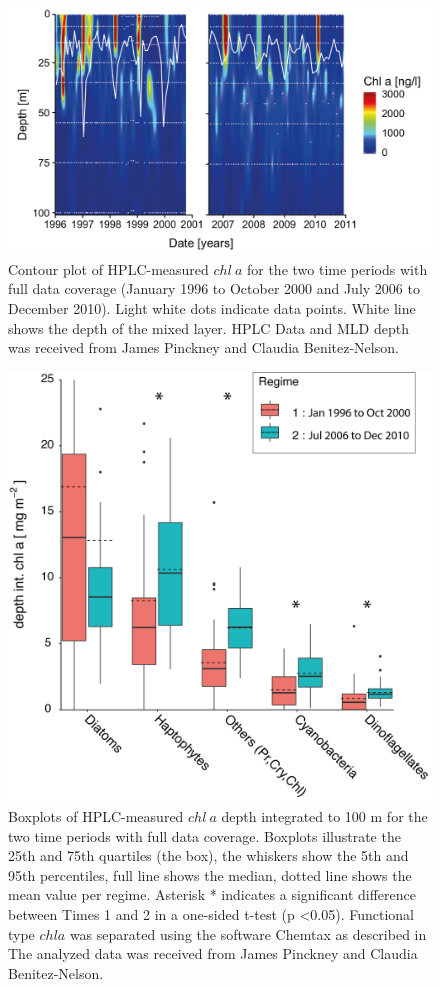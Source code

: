 \begin{figure}
\centering
\includegraphics[trim = 0mm 0mm 0mm 0mm, clip, width=.9\linewidth]{./Chp2-Pre/Pinckneyetal2015_TotChlAcontoursMLD.png}
\caption[Scheme]{\small {Contour plot of HPLC-measured $chl~a$ for the two time periods with full data coverage (January 1996 to October 2000 and July 2006 to December 2010). Light white dots indicate data points. White line shows the depth of the mixed layer. HPLC Data and MLD depth was received from James Pinckney and Claudia Benitez-Nelson.}}
\label{TChlAPinckney}
\end{figure}


\begin{figure}
\centering
\includegraphics[trim = 0mm 0mm 0mm 0mm, clip, width=.7\linewidth]{./Chp2-Pre/PFT_groupsAsset511.png}
\caption[Scheme]{\small {Boxplots of HPLC-measured $chl~a$ depth integrated to 100 m for the two time periods with full data coverage. Boxplots illustrate the 25th and 75th quartiles (the box), the whiskers show the 5th and 95th percentiles, full line shows the median, dotted line shows the mean value per regime. Asterisk * indicates a significant difference between Times 1 and 2 in a one-sided t-test (p \textless	 0.05). Functional type $chl a$ was separated using the software Chemtax as described in \citet{Pinckney2015} The analyzed data was received from James Pinckney and Claudia Benitez-Nelson.}}
\label{PFTcariaco}
\end{figure}

